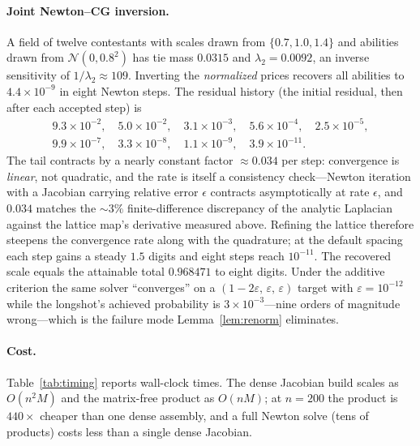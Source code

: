 \documentclass[11pt]{article}
\theoremstyle{definition}
\theoremstyle{remark}
\begin{document}
\paragraph{Joint Newton--CG inversion.}
A field of twelve contestants with scales drawn from $\{0.7, 1.0, 1.4\}$ and
abilities drawn from $\mathcal N(0, 0.8^2)$ has tie mass $0.0315$ and
$\lambda_2 = 0.0092$, an inverse sensitivity of $1/\lambda_2 \approx 109$.
Inverting the \emph{normalized} prices recovers all abilities to
$4.4\times10^{-9}$ in eight Newton steps.  The residual history (the
initial residual, then after each accepted step) is
\begin{gather*}
  9.3\!\times\!10^{-2},\quad
  5.0\!\times\!10^{-2},\quad
  3.1\!\times\!10^{-3},\quad
  5.6\!\times\!10^{-4},\quad
  2.5\!\times\!10^{-5},\\
  9.9\!\times\!10^{-7},\quad
  3.3\!\times\!10^{-8},\quad
  1.1\!\times\!10^{-9},\quad
  3.9\!\times\!10^{-11}.
\end{gather*}
The tail contracts by a nearly constant factor $\approx 0.034$ per step:
convergence is \emph{linear}, not quadratic, and the rate is itself a
consistency check---Newton iteration with a Jacobian carrying relative
error $\epsilon$ contracts asymptotically at rate $\epsilon$, and
$0.034$ matches the $\sim\!3\%$ finite-difference discrepancy of the
analytic Laplacian against the lattice map's derivative measured above.
Refining the lattice therefore steepens the convergence rate along with
the quadrature; at the default spacing each step gains a steady
$1.5$ digits and eight steps reach $10^{-11}$.  The recovered scale
equals the attainable total $0.968471$ to eight digits.  Under the additive
criterion the same solver ``converges'' on a
$(1-2\varepsilon,\,\varepsilon,\,\varepsilon)$ target with
$\varepsilon = 10^{-12}$ while the longshot's achieved probability is
$3\times10^{-3}$---nine orders of magnitude wrong---which is the failure
mode Lemma~\ref{lem:renorm} eliminates.

\paragraph{Cost.}
Table~\ref{tab:timing} reports wall-clock times.  The dense Jacobian build
scales as $O(n^2 M)$ and the matrix-free product as $O(nM)$; at $n = 200$
the product is $440\times$ cheaper than one dense assembly, and a full
Newton solve (tens of products) costs less than a single dense Jacobian.
\end{document}
